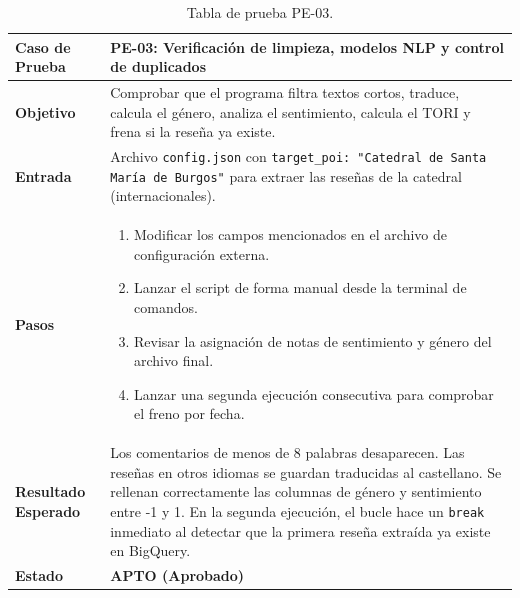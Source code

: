 \begin{table}[p]
	\centering
	\begin{tabularx}{\linewidth}{ p{} X }
		\toprule
		\textbf{Caso de Prueba} & \textbf{PE-03: Verificación de limpieza, modelos NLP y control de duplicados} \\
		\toprule
		\textbf{Objetivo}       & Comprobar que el programa filtra textos cortos, traduce, calcula el género, analiza el sentimiento, calcula el TORI y frena si la reseña ya existe. \\ \midrule
		\textbf{Entrada}        & Archivo \texttt{config.json} con \texttt{target\_poi: "Catedral de Santa María de Burgos"} para extraer las reseñas de la catedral (internacionales). \\ \midrule
		\textbf{Pasos}          & 
		\begin{enumerate}
			\tightlist
			\item Modificar los campos mencionados en el archivo de configuración externa.
			\item Lanzar el script de forma manual desde la terminal de comandos.
			\item Revisar la asignación de notas de sentimiento y género del archivo final.
			\item Lanzar una segunda ejecución consecutiva para comprobar el freno por fecha.
		\end{enumerate} \\ \midrule
		\textbf{Resultado Esperado} & Los comentarios de menos de 8 palabras desaparecen. Las reseñas en otros idiomas se guardan traducidas al castellano. Se rellenan correctamente las columnas de género y sentimiento entre -1 y 1. En la segunda ejecución, el bucle hace un \texttt{break} inmediato al detectar que la primera reseña extraída ya existe en BigQuery. \\ \midrule
		\textbf{Estado}         & \textbf{APTO (Aprobado)} \\
		\bottomrule
	\end{tabularx}
	\caption{Tabla de prueba PE-03.}
\end{table}

